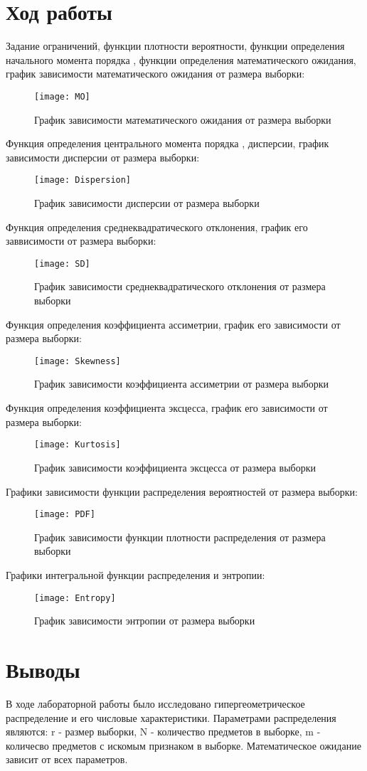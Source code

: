 \documentclass[a4paper,14pt]{extarticle}
\begin{document}
\section{Ход работы}
Задание ограничений, функции плотности вероятности, функции определения
начального момента порядка , функции определения математического
ожидания, график зависимости математического ожидания от размера выборки:
\begin{figure}[H]
    \centering
    \texttt{[image: MO]}
    \caption{График зависимости математического ожидания от размера выборки}
\end{figure}
Функция определения центрального момента порядка , дисперсии,
график зависимости дисперсии от размера выборки:
\begin{figure}[H]
    \centering
    \texttt{[image: Dispersion]}
    \caption{График зависимости дисперсии от размера выборки}
\end{figure}
Функция определения среднеквадратического отклонения, график его заввисимости
от размера выборки:
\begin{figure}[H]
    \centering
    \texttt{[image: SD]}
    \caption{График зависимости среднеквадратического отклонения
    от размера выборки}
\end{figure}
Функция определения коэффициента ассиметрии, график его зависимости
от размера выборки:
\begin{figure}[H]
    \centering
    \texttt{[image: Skewness]}
    \caption{График зависимости коэффициента ассиметрии
    от размера выборки}
\end{figure}
Функция определения коэффициента эксцесса, график его зависимости
от размера выборки:
\begin{figure}[H]
    \centering
    \texttt{[image: Kurtosis]}
    \caption{График зависимости коэффициента эксцесса
    от размера выборки}
\end{figure}
Графики зависимости функции распределения вероятностей от
размера выборки:
\begin{figure}[H]
    \centering
    \texttt{[image: PDF]}
    \caption{График зависимости функции плотности распределения
    от размера выборки}
\end{figure}
Графики интегральной функции распределения и энтропии:
\begin{figure}[H]
    \centering
    \texttt{[image: Entropy]}
    \caption{График зависимости энтропии
    от размера выборки}
\end{figure}
\section*{Выводы}
В ходе лабораторной работы было исследовано гипергеометрическое
распределение и его числовые характеристики. Параметрами
распределения являются: r - размер выборки, N - количество
предметов в выборке, m - количесво предметов с искомым признаком
в выборке. Математическое ожидание зависит от всех параметров.
\end{document}
